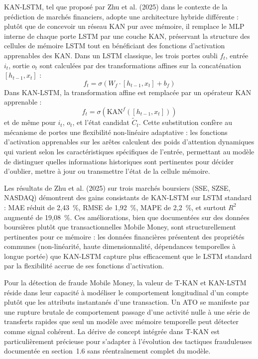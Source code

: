 \documentclass[11pt,a4paper,oneside]{report}
\theoremstyle{definition}
\theoremstyle{remark}
\begin{document}
KAN-LSTM, tel que proposé par Zhu et al. (2025) dans le contexte de la prédiction de marchés financiers, adopte une architecture hybride différente : plutôt que de concevoir un réseau KAN pur avec mémoire, il remplace le MLP interne de chaque porte LSTM par une couche KAN, préservant la structure des cellules de mémoire LSTM tout en bénéficiant des fonctions d'activation apprenables des KAN. Dans un LSTM classique, les trois portes  oubli $f_t$, entrée $i_t$, sortie $o_t$  sont calculées par des transformations affines sur la concaténation $[h_{t-1}, x_t]$ :
\begin{equation}
f_t = \sigma(W_f \cdot [h_{t-1}, x_t] + b_f)
\end{equation}
Dans KAN-LSTM, la transformation affine est remplacée par un opérateur KAN apprenable :
\begin{equation}
f_t = \sigma(\text{KAN}^f([h_{t-1}, x_t]))
\end{equation}
et de même pour $i_t$, $o_t$, et l'état candidat $\tilde{C}_t$. Cette substitution confère au mécanisme de portes une flexibilité non-linéaire adaptative : les fonctions d'activation apprenables sur les arêtes calculent des poids d'attention dynamiques qui varient selon les caractéristiques spécifiques de l'entrée, permettant au modèle de distinguer quelles informations historiques sont pertinentes pour décider d'oublier, mettre à jour ou transmettre l'état de la cellule mémoire.

Les résultats de Zhu et al. (2025) sur trois marchés boursiers (SSE, SZSE, NASDAQ) démontrent des gains consistants de KAN-LSTM sur LSTM standard : MAE réduit de 2,43~\%, RMSE de 1,92~\%, MAPE de 2,2~\%, et surtout $R^2$ augmenté de 19,08~\%. Ces améliorations, bien que documentées sur des données boursières plutôt que transactionnelles Mobile Money, sont structurellement pertinentes pour ce mémoire : les données financières présentent des propriétés communes (non-linéarité, haute dimensionnalité, dépendances temporelles à longue portée) que KAN-LSTM capture plus efficacement que le LSTM standard par la flexibilité accrue de ses fonctions d'activation.

Pour la détection de fraude Mobile Money, la valeur de T-KAN et KAN-LSTM réside dans leur capacité à modéliser le comportement longitudinal d'un compte plutôt que les attributs instantanés d'une transaction. Un ATO se manifeste par une rupture brutale de comportement  passage d'une activité nulle à une série de transferts rapides  que seul un modèle avec mémoire temporelle peut détecter comme signal cohérent. La dérive de concept intégrée dans T-KAN est particulièrement précieuse pour s'adapter à l'évolution des tactiques frauduleuses documentée en section~1.6 sans réentraînement complet du modèle.
\end{document}
